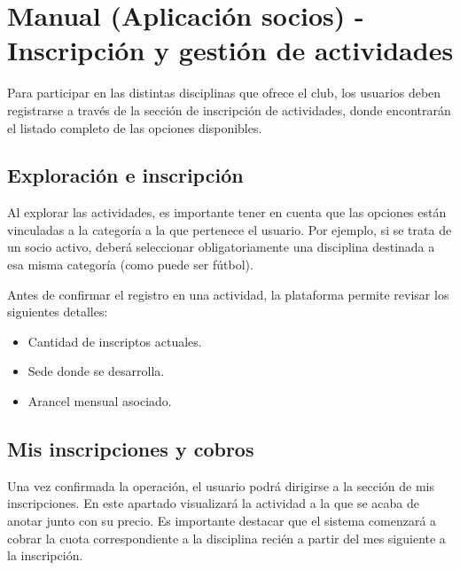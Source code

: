 \section{Manual (Aplicación socios) - Inscripción y gestión de actividades}

Para participar en las distintas disciplinas que ofrece el club, los usuarios deben registrarse a través de la sección de inscripción de actividades, donde encontrarán el listado completo de las opciones disponibles.

\subsection{Exploración e inscripción}
Al explorar las actividades, es importante tener en cuenta que las opciones están vinculadas a la categoría a la que pertenece el usuario. Por ejemplo, si se trata de un socio activo, deberá seleccionar obligatoriamente una disciplina destinada a esa misma categoría (como puede ser fútbol).

Antes de confirmar el registro en una actividad, la plataforma permite revisar los siguientes detalles:
\begin{itemize}
    \item Cantidad de inscriptos actuales.
    \item Sede donde se desarrolla.
    \item Arancel mensual asociado.
\end{itemize}

\subsection{Mis inscripciones y cobros}
Una vez confirmada la operación, el usuario podrá dirigirse a la sección de mis inscripciones. En este apartado visualizará la actividad a la que se acaba de anotar junto con su precio. Es importante destacar que el sistema comenzará a cobrar la cuota correspondiente a la disciplina recién a partir del mes siguiente a la inscripción.

